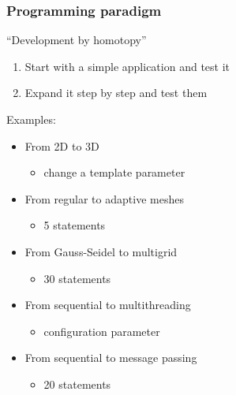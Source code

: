 \begin{frame}
  \frametitle{Programming paradigm}
  \begin{block}{``Development by homotopy''}
    \begin{enumerate}
    \item Start with a simple application and test it
    \item Expand it step by step and test them
    \end{enumerate}
  \end{block}
  \pause
  Examples:
  \begin{itemize}
  \item<+-> From 2D to 3D
    \begin{itemize}
    \item change a template parameter
    \end{itemize}
  \item<+-> From regular to adaptive meshes
    \begin{itemize}
    \item 5 statements
    \end{itemize}
  \item<+-> From Gauss-Seidel to multigrid
    \begin{itemize}
    \item 30 statements
    \end{itemize}
  \item<+-> From sequential to multithreading
    \begin{itemize}
    \item configuration parameter
    \end{itemize}
  \item<+-> From sequential to message passing
    \begin{itemize}
    \item 20 statements
    \end{itemize}
  \end{itemize}
\end{frame}

